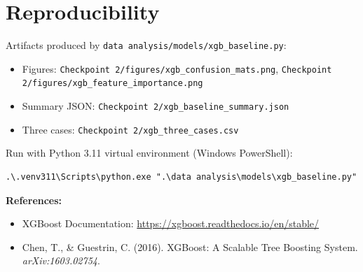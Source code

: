 \documentclass[11pt]{article}
\begin{document}
\section*{Reproducibility}
Artifacts produced by \texttt{data analysis/models/xgb\_baseline.py}:
\begin{itemize}[leftmargin=*]
  \item Figures: \texttt{Checkpoint 2/figures/xgb\_confusion\_mats.png}, \texttt{Checkpoint 2/figures/xgb\_feature\_importance.png}
  \item Summary JSON: \texttt{Checkpoint 2/xgb\_baseline\_summary.json}
  \item Three cases: \texttt{Checkpoint 2/xgb\_three\_cases.csv}
\end{itemize}
Run with Python 3.11 virtual environment (Windows PowerShell):
\begin{verbatim}
.\.venv311\Scripts\python.exe ".\data analysis\models\xgb_baseline.py"
\end{verbatim}

\vspace{.5em}
\noindent\textbf{References:}
\begin{itemize}[leftmargin=*]
  \item XGBoost Documentation: \url{https://xgboost.readthedocs.io/en/stable/}
  \item Chen, T., \& Guestrin, C. (2016). XGBoost: A Scalable Tree Boosting System. \emph{arXiv:1603.02754}.
\end{itemize}
\end{document}
